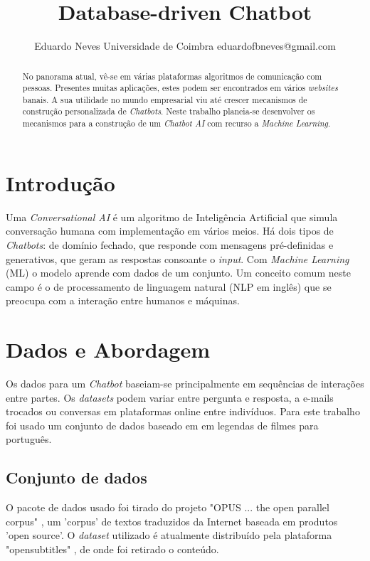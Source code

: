 \documentclass{article}
\title{Database-driven Chatbot}
\author{
    Eduardo Neves
    \affiliations
    Universidade de Coimbra
    \emails
    eduardofbneves@gmail.com
}
\begin{document}
\maketitle

\begin{abstract}
No panorama atual, vê-se em várias plataformas algoritmos de comunicação com pessoas. Presentes muitas aplicações, estes podem ser encontrados em vários \textit{websites} banais. A sua utilidade no mundo empresarial viu até crescer mecanismos de construção personalizada de \textit{Chatbots}. Neste trabalho planeia-se desenvolver os mecanismos para a construção de um \textit{Chatbot AI} com recurso a \textit{Machine Learning}.
\end{abstract}

\section{Introdução}
Uma \textit{Conversational AI} é um algoritmo de Inteligência Artificial que simula conversação humana com implementação em vários meios. Há dois tipos de \textit{Chatbots}: de domínio fechado, que responde com mensagens pré-definidas e generativos, que geram as respostas consoante o \textit{input}. Com \textit{Machine Learning} (ML) o modelo aprende com dados de um conjunto. Um conceito comum neste campo é o de processamento de linguagem natural (NLP em inglês) que se preocupa com a interação entre humanos e máquinas. 


\section{Dados e Abordagem}
Os dados para um \textit{Chatbot} baseiam-se principalmente em sequências de interações entre partes. Os \textit{datasets} podem variar entre pergunta e resposta, a e-mails trocados ou conversas em plataformas online entre indivíduos. Para este trabalho foi usado um conjunto de dados baseado em em legendas de filmes para português.

\subsection{Conjunto de dados}
O pacote de dados usado foi tirado do projeto "OPUS ... the open parallel corpus" \cite{opus}, um 'corpus' de textos traduzidos da Internet baseada em produtos 'open source'. O \textit{dataset} utilizado é atualmente distribuído pela plataforma "opensubtitles" \cite{opensubtitles}, de onde foi retirado o conteúdo.
\end{document}

